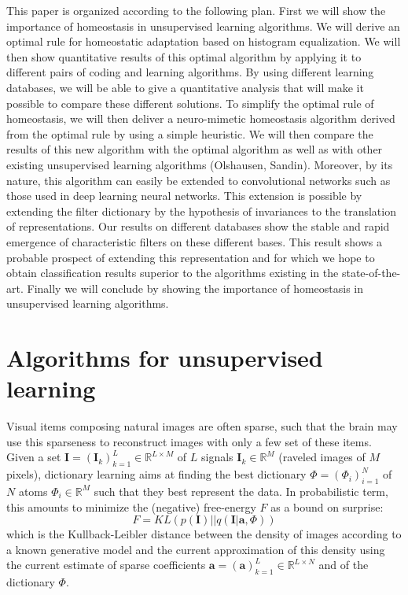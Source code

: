\documentclass[a4paper, 11pt, draft]{article} %
\newcommand{\RR}{\mathbb{R}}
\newcommand{\coef}{\mathbf{a}} %
\newcommand{\image}{\mathbf{I}} %
\newcommand{\dico}{\Phi} %
\begin{document}
This paper is organized according to the following plan. First we will show the importance of homeostasis in unsupervised learning algorithms. We will derive an optimal rule for homeostatic adaptation based on histogram equalization. We will then show quantitative results of this optimal algorithm by applying it to different pairs of coding and learning algorithms. By using different learning databases, we will be able to give a quantitative analysis that will make it possible to compare these different solutions. To simplify the optimal rule of homeostasis, we will then deliver a neuro-mimetic homeostasis algorithm derived from the optimal rule by using a simple heuristic. We will then compare the results of this new algorithm with the optimal algorithm as well as with other existing unsupervised learning algorithms (Olshausen, Sandin). Moreover, by its nature, this algorithm can easily be extended to convolutional networks such as those used in deep learning neural networks. This extension is possible by extending the filter dictionary by the hypothesis of invariances to the translation of representations. Our results on different databases show the stable and rapid emergence of characteristic filters on these different bases. This result shows a probable prospect of extending this representation and for which we hope to obtain classification results superior to the algorithms existing in the state-of-the-art. Finally we will conclude by showing the importance of homeostasis in unsupervised learning algorithms.
\section{Algorithms for unsupervised learning}\label{algorithm}
Visual items composing natural images are often sparse, such that the brain may use this sparseness to reconstruct images with only a few set of these items. Given a set $\image = (\image_k)_{k=1}^L \in \RR^{L \times M} $ of $L$ signals $\image_k \in \RR^M$ (raveled images of $M$ pixels), dictionary learning aims at finding the best dictionary $\dico=(\dico_i)_{i=1}^N$ of $N$ atoms $\dico_i \in \RR^M$ such that they best represent the data. In probabilistic term, this amounts to minimize the (negative) free-energy $F$ as a bound on surprise:
$$ F = KL( p(\image ) || q(\image | \coef, \dico ) )$$
which is the Kullback-Leibler distance between the density of images according to a known generative model and the current approximation of this density using the current estimate of sparse coefficients $\coef = (\coef)_{k=1}^L \in \RR^{L \times N} $ and of the dictionary $\dico$.
\end{document}
